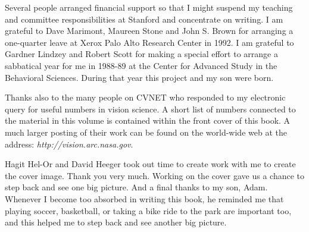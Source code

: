 Several people arranged financial support so that I might suspend my
teaching and committee responsibilities at Stanford and concentrate on
writing.  I am grateful to Dave Marimont, Maureen Stone and John S.
Brown for arranging a one-quarter leave at Xerox Palo Alto Research
Center in 1992.  I am grateful to Gardner Lindzey and Robert Scott for
making a special effort to arrange a sabbatical year for me in 1988-89
at the Center for Advanced Study in the Behavioral Sciences.  During
that year this project and my son were born.

Thanks also to the many people on CVNET who responded to my electronic
query for useful numbers in vision science. A short list of numbers
connected to the material in this volume is contained within the front
cover of this book.  A much larger posting of their work can be found
on the world-wide web at the address: {\em
http://vision.arc.nasa.gov}.

Hagit Hel-Or and David Heeger took out time to create work with me to
create the cover image.  Thank you very much.  Working on the cover
gave us a chance to step back and see one big picture.  And a final
thanks to my son, Adam.  Whenever I become too absorbed in writing
this book, he reminded me that playing soccer, basketball, or taking a
bike ride to the park are important too, and this helped me to step
back and see another big picture.


